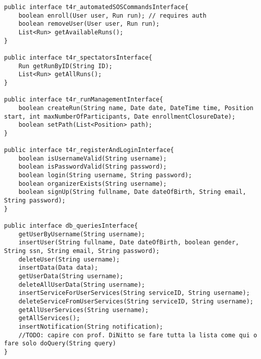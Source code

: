 \documentclass[../../DD.tex]{subfiles}
\begin{document}
\begin{lstlisting}
public interface t4r_automatedSOSCommandsInterface{
	boolean enroll(User user, Run run); // requires auth
	boolean removeUser(User user, Run run);
	List<Run> getAvailableRuns();
}

public interface t4r_spectatorsInterface{
	Run getRunByID(String ID);
	List<Run> getAllRuns();
}

public interface t4r_runManagementInterface{
	boolean createRun(String name, Date date, DateTime time, Position start, int maxNumberOfParticipants, Date enrollmentClosureDate);
	boolean setPath(List<Position> path);
}

public interface t4r_registerAndLoginInterface{
	boolean isUsernameValid(String username);
	boolean isPasswordValid(String password);
	boolean login(String username, String password);
	boolean organizerExists(String username);
	boolean signUp(String fullname, Date dateOfBirth, String email, String password);
}

public interface db_queriesInterface{
	getUserByUsername(String username);
	insertUser(String fullname, Date dateOfBirth, boolean gender, String ssn, String email, String password);
	deleteUser(String username);
	insertData(Data data);
	getUserData(String username);
	deleteAllUserData(String username);
	insertServiceForUserServices(String serviceID, String username);
	deleteServiceFromUserServices(String serviceID, String username);
	getAllUserServices(String username);
	getAllServices();
	insertNotification(String notification);
	//TODO: capire con prof. DiNitto se fare tutta la lista come qui o fare solo doQuery(String query)
}
\end{lstlisting}
\end{document}
